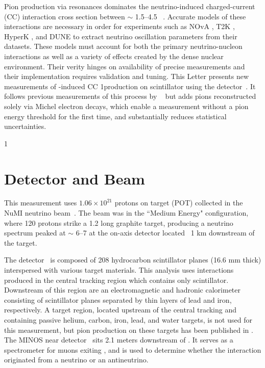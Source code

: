 \documentclass[aps,prl,twocolumn,showpacs,superscriptaddress,letterpaper,showkeys,superscriptaddress,floatfix,nofootinbib]{revtex4-1}
\newcommand{\showSections}[0]{0}
\begin{document}
Pion production via resonances dominates the neutrino-induced charged-current (CC) interaction cross section between \Enu $\sim$ 1.5--4.5 \GeV~\cite{Formaggio:2013kya}.   Accurate models of these interactions are necessary in order for experiments such as NOvA \cite{PhysRevD.106.032004}, T2K \cite{Abe:2011ks}, HyperK \cite{Hyper-Kamiokande:2018ofw}, and DUNE \cite{DUNE:2015lol} to extract neutrino oscillation parameters from their datasets.  These models must account for both the primary neutrino-nucleon interactions as well as a variety of effects created by the dense nuclear environment. Their verity hinges on availability of precise measurements and their implementation requires validation and tuning. This Letter presents new measurements of \numu-induced CC 1\pip production on scintillator using the \minerva detector~\cite{Aliaga:2013uqz}. It follows previous measurements of this process by \minerva~\cite{Eberly:2014mra,McGivern:2016bwh,Bercellie.131.011801} but adds pions reconstructed solely via Michel electron decays, which enable a measurement without a pion energy threshold for the first time, and substantially reduces statistical uncertainties.

\if\showSections1 \section{\minerva Detector and Beam} \fi

This measurement uses $1.06\times 10^{21}$ protons on target (POT) collected in the NuMI neutrino beam~\cite{Anderson:1998zza,Adamson:2015dkw}.  The beam was in the ``Medium Energy" configuration, where 120 \GeVc protons strike a 1.2 \m long graphite target, producing a neutrino spectrum peaked at \Enu$\sim$ 6--7 \GeV at the on-axis \minerva detector located ~1 km downstream of the target.  

The \minerva detector~\cite{Aliaga:2013uqz} is composed of 208 hydrocarbon scintillator planes (16.6 mm thick) interspersed with various target materials. This analysis uses interactions produced in the central tracking region which contains only scintillator. Downstream of this region are an electromagnetic and hadronic calorimeter consisting of scintillator planes separated by thin layers of lead and iron, respectively. A target region, located upstream of the central tracking and containing passive helium, carbon, iron, lead, and water targets, is not used for this measurement, but pion production on these targets has been published in \cite{Bercellie.131.011801}. The MINOS near detector~\cite{MINOS:2008hdf} sits 2.1 meters downstream of \minerva. It serves as a spectrometer for muons exiting \minerva, and is used to determine whether the interaction originated from a neutrino or an antineutrino.
 
\end{document}
